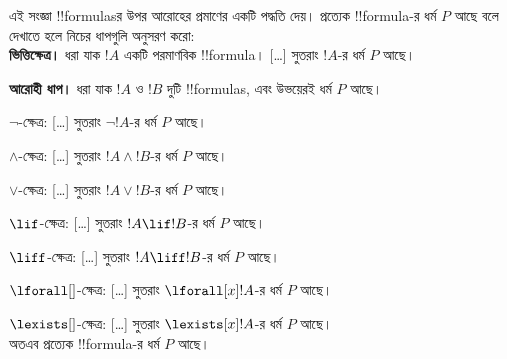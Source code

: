 \documentclass[../../../include/open-logic-section]{subfiles}
\begin{document}
\begin{explain}
এই সংজ্ঞা !!{formula}sর উপর আরোহের প্রমাণের একটি পদ্ধতি দেয়।
প্রত্যেক !!{formula}-র ধর্ম $P$ আছে বলে দেখাতে হলে নিচের
ধাপগুলি অনুসরণ করো:\\

\textbf{ভিত্তিক্ষেত্র।} ধরা যাক $!A$ একটি পরমাণবিক !!{formula}।
[\ldots] সুতরাং $!A$-র ধর্ম $P$ আছে।

\textbf{আরোহী ধাপ।} ধরা যাক $!A$ ও $!B$ দুটি !!{formula}s,
এবং উভয়েরই ধর্ম $P$ আছে।

$\lnot$-ক্ষেত্র: [\ldots] সুতরাং $\lnot !A$-র ধর্ম $P$ আছে।

$\land$-ক্ষেত্র: [\ldots] সুতরাং $!A \land !B$-র ধর্ম $P$ আছে।

$\lor$-ক্ষেত্র: [\ldots] সুতরাং $!A \lor !B$-র ধর্ম $P$ আছে।

$\lif$-ক্ষেত্র: [\ldots] সুতরাং $!A \lif !B$-র ধর্ম $P$ আছে।

$\liff$-ক্ষেত্র: [\ldots] সুতরাং $!A \liff !B$-র ধর্ম $P$ আছে।

$\lforall[]$-ক্ষেত্র: [\ldots] সুতরাং $\lforall[x] !A$-র ধর্ম $P$ আছে।

$\lexists[]$-ক্ষেত্র: [\ldots] সুতরাং $\lexists[x] !A$-র ধর্ম $P$ আছে। \\

অতএব প্রত্যেক !!{formula}-র ধর্ম $P$ আছে।
\end{explain}
\end{document}
